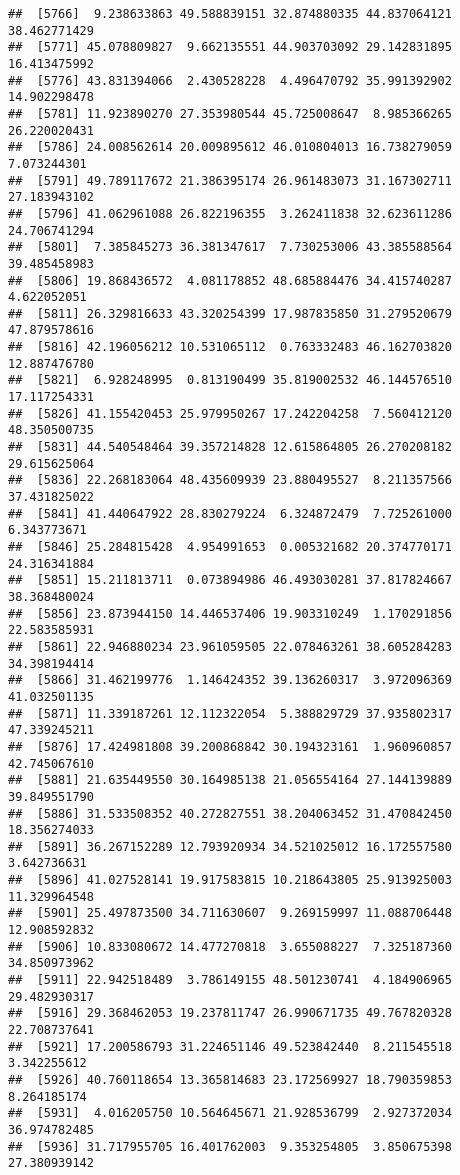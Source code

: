 \documentclass[
]{article}
\begin{document}
\begin{verbatim}
##  [5766]  9.238633863 49.588839151 32.874880335 44.837064121 38.462771429
##  [5771] 45.078809827  9.662135551 44.903703092 29.142831895 16.413475992
##  [5776] 43.831394066  2.430528228  4.496470792 35.991392902 14.902298478
##  [5781] 11.923890270 27.353980544 45.725008647  8.985366265 26.220020431
##  [5786] 24.008562614 20.009895612 46.010804013 16.738279059  7.073244301
##  [5791] 49.789117672 21.386395174 26.961483073 31.167302711 27.183943102
##  [5796] 41.062961088 26.822196355  3.262411838 32.623611286 24.706741294
##  [5801]  7.385845273 36.381347617  7.730253006 43.385588564 39.485458983
##  [5806] 19.868436572  4.081178852 48.685884476 34.415740287  4.622052051
##  [5811] 26.329816633 43.320254399 17.987835850 31.279520679 47.879578616
##  [5816] 42.196056212 10.531065112  0.763332483 46.162703820 12.887476780
##  [5821]  6.928248995  0.813190499 35.819002532 46.144576510 17.117254331
##  [5826] 41.155420453 25.979950267 17.242204258  7.560412120 48.350500735
##  [5831] 44.540548464 39.357214828 12.615864805 26.270208182 29.615625064
##  [5836] 22.268183064 48.435609939 23.880495527  8.211357566 37.431825022
##  [5841] 41.440647922 28.830279224  6.324872479  7.725261000  6.343773671
##  [5846] 25.284815428  4.954991653  0.005321682 20.374770171 24.316341884
##  [5851] 15.211813711  0.073894986 46.493030281 37.817824667 38.368480024
##  [5856] 23.873944150 14.446537406 19.903310249  1.170291856 22.583585931
##  [5861] 22.946880234 23.961059505 22.078463261 38.605284283 34.398194414
##  [5866] 31.462199776  1.146424352 39.136260317  3.972096369 41.032501135
##  [5871] 11.339187261 12.112322054  5.388829729 37.935802317 47.339245211
##  [5876] 17.424981808 39.200868842 30.194323161  1.960960857 42.745067610
##  [5881] 21.635449550 30.164985138 21.056554164 27.144139889 39.849551790
##  [5886] 31.533508352 40.272827551 38.204063452 31.470842450 18.356274033
##  [5891] 36.267152289 12.793920934 34.521025012 16.172557580  3.642736631
##  [5896] 41.027528141 19.917583815 10.218643805 25.913925003 11.329964548
##  [5901] 25.497873500 34.711630607  9.269159997 11.088706448 12.908592832
##  [5906] 10.833080672 14.477270818  3.655088227  7.325187360 34.850973962
##  [5911] 22.942518489  3.786149155 48.501230741  4.184906965 29.482930317
##  [5916] 29.368462053 19.237811747 26.990671735 49.767820328 22.708737641
##  [5921] 17.200586793 31.224651146 49.523842440  8.211545518  3.342255612
##  [5926] 40.760118654 13.365814683 23.172569927 18.790359853  8.264185174
##  [5931]  4.016205750 10.564645671 21.928536799  2.927372034 36.974782485
##  [5936] 31.717955705 16.401762003  9.353254805  3.850675398 27.380939142

\end{verbatim}
\end{document}
